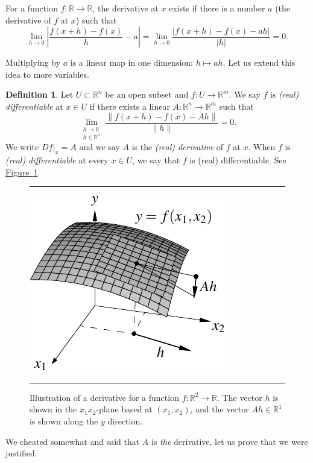 \documentclass[12pt,openany]{book}
\newcommand{\sabs}[1]{\lvert {#1} \rvert}
\newcommand{\snorm}[1]{\lVert {#1} \rVert}
\newcommand{\abs}[1]{\left\lvert {#1} \right\rvert}
\newcommand{\R}{{\mathbb{R}}}
\theoremstyle{plain}
\theoremstyle{remark}
\theoremstyle{definition}
\newtheorem{defn}[thm]{Definition}
\newenvironment{myfig}{%
\begin{figure}[h!t]
\noindent\rule{\textwidth}{0.4pt}\vspace{12pt}\par\centering}%
{\par\noindent\rule{\textwidth}{0.4pt}
\end{figure}}
\theoremstyle{exercise}
\theoremstyle{example}
\newcommand{\figureref}[1]{\hyperref[#1]{Figure~\ref*{#1}}}
\begin{document}
For a function $f \colon \R \to \R$, 
the derivative at $x$ exists if 
there is a number $a$ (the derivative of $f$ at $x$) such that
\begin{equation*}
\lim_{h \to 0} \abs{\frac{f(x+h)-f(x)}{h} - a} =
\lim_{h \to 0} \frac{\sabs{f(x+h)-f(x) - ah}}{\sabs{h}}
= 0.
\end{equation*}

Multiplying by $a$ is a linear map in one dimension:
$h \mapsto ah$.  Let us extend this idea to more variables.

\begin{defn}
Let $U \subset \R^n$ be an open subset and $f \colon U \to \R^m$.  We
say $f$ is \emph{(real) differentiable}
at $x \in U$ if there exists
a linear $A \colon \R^n \to \R^m$ such that
\begin{equation*}
\lim_{\substack{h \to 0\\h\in \R^n}}
\frac{\snorm{f(x+h)-f(x) - Ah}}{\snorm{h}} = 0 .
\end{equation*}
We write $Df|_x = A$ and
we say $A$ is the \emph{(real) derivative} of $f$ at $x$.
When $f$ is \emph{(real) differentiable} at
every $x \in U$, we say that $f$ is (real) differentiable.  See
\figureref{fig:svder}.
\end{defn}

\begin{myfig}
\includegraphics{figures/svder}
\caption{Illustration of a derivative for a function $f \colon \R^2 \to \R$.  The vector $h$ is shown
in the $x_1x_2$-plane based at $(x_1,x_2)$, and the vector
$Ah \in \R^1$ is shown along the $y$ direction.\label{fig:svder}}
\end{myfig}

We cheated somewhat and said that $A$
is \emph{the} derivative, let us prove that we were justified.
\end{document}
